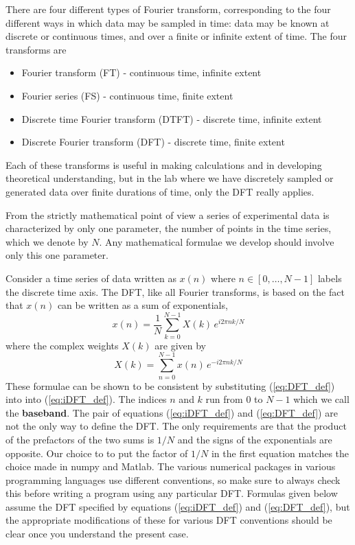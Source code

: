 
There are four different types of Fourier transform, corresponding
to the four different ways in which data may be sampled in time: data
may be known at discrete or continuous times, and over a finite or
infinite extent of time. The four transforms are 
\begin{itemize}
  \item Fourier transform (FT) - continuous time, infinite extent 
  \item Fourier series (FS) - continuous time, finite extent 
  \item Discrete time Fourier transform (DTFT) - discrete time, infinite extent 
  \item Discrete Fourier transform (DFT) - discrete time, finite extent 
\end{itemize}
Each of these transforms is useful in making calculations and in developing theoretical understanding, but in the lab where we have discretely sampled or generated data over finite durations of time, only the DFT really applies.



From the strictly mathematical point of view a series of experimental data is characterized by only one parameter, the number of points in the time series, which we denote by $N$.
Any mathematical formulae we develop should involve only this one parameter.


Consider a time series of data written as $x(n)$ where $n \in [0,\dots,N-1]$ labels the discrete time axis.
The DFT, like all Fourier transforms, is based on the fact that $x(n)$ can be written as a sum of exponentials,
\begin{equation}
x(n)=\frac{1}{N}\sum_{k=0}^{N-1}X(k)\, e^{i2\pi nk/N} \label{eq:iDFT_def}
\end{equation}
where the complex weights $X(k)$ are given by
\begin{equation}
X(k)=\sum_{n=0}^{N-1}x(n)\, e^{-i2\pi nk/N} \label{eq:DFT_def}
\end{equation}
These formulae can be shown to be consistent by substituting (\ref{eq:DFT_def}) into  into (\ref{eq:iDFT_def}).
The indices $n$ and $k$ run from $0$ to $N-1$ which we call the \textbf{baseband}.
The pair of equations (\ref{eq:iDFT_def}) and (\ref{eq:DFT_def}) are not the only way to define the DFT.
The only requirements are that the product of the prefactors of the two sums is $1/N$ and the signs of the exponentials are opposite.
Our choice to to put the factor of $1/N$ in the first equation matches the choice made in numpy and Matlab.
The various numerical packages in various programming languages use different conventions, so make sure to always check this before writing a program using any particular DFT.
Formulas given below assume the DFT specified by equations (\ref{eq:iDFT_def}) and (\ref{eq:DFT_def}), but the appropriate modifications of these for various DFT conventions should be clear once you understand the present case.


